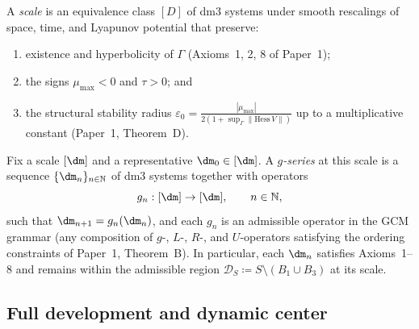 \begin{definition}[Scale]\label{def:scale}
A \emph{scale} is an equivalence class $[D]$ of dm3 systems under
smooth rescalings of space, time, and Lyapunov potential that
preserve:
\begin{enumerate}[label=(\roman*)]
  \item existence and hyperbolicity of $\Gamma$
    (Axioms~1, 2, 8 of Paper~1);
  \item the signs $\mu_{\max} < 0$ and $\tau > 0$; and
  \item the structural stability radius $\varepsilon_0 =
    \tfrac{|\mu_{\max}|}{2(1 + \sup_\Gamma \|\mathrm{Hess}\,V\|)}$
    up to a multiplicative constant (Paper~1, Theorem~D).
\end{enumerate}
\end{definition}

\begin{definition}\label{def:gseries}
Fix a scale $[\dm]$ and a representative $\dm_0 \in [\dm]$. A
\emph{$g$-series} at this scale is a sequence
$\{\dm_n\}_{n \in \mathbb{N}}$ of dm3 systems together with
operators
\[
  g_n : [\dm] \to [\dm], \qquad n \in \mathbb{N},
\]
such that $\dm_{n+1} = g_n(\dm_n)$, and each $g_n$ is an admissible
operator in the GCM grammar (any composition of $g$-, $L$-, $R$-,
and $U$-operators satisfying the ordering constraints of
Paper~1, Theorem~B). In particular, each $\dm_n$ satisfies
Axioms~1--8 and remains within the admissible region
$\mathcal{D}_S \coloneqq S \setminus (B_1 \cup B_3)$ at its scale.
\end{definition}

\subsection{Full development and dynamic center}

